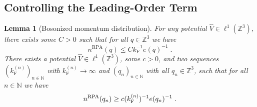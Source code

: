 \documentclass[12pt,a4paper]{article}
\numberwithin{equation}{section}
\newcommand{\NNN}{\mathbb{N}}
\newcommand{\1}{\mathbb{I}}
\newcommand{\F}{\mathrm{F}}
\newcommand{\RPA}{\mathrm{RPA}}
\newcommand{\Zstar}{\mathbb{Z}^3} %
\newcommand{\Z}{\mathbb{Z}}
\theoremstyle{plain}
\newtheorem{lemma}[theorem]{Lemma}
\theoremstyle{definition}
\theoremstyle{remark}
\theoremstyle{plain}
\theoremstyle{definition}
\theoremstyle{remark}
\begin{document}
\subsection{Controlling the Leading-Order Term}
\label{subsec:control_nqb}

\begin{lemma}[Bosonized momentum distribution] \label{lem:nqb_bounds}
For any potential $ \hat{V} \in \ell^1(\Zstar) $, there exists some $ C > 0 $
such that for all $ q \in \Z^3 $ we have
\begin{equation} \label{eq:nqb_upperbound}
	n^{\RPA}(q)
	\le C k_{\F}^{-1} e(q)^{-1} \;.
\end{equation}
There exists a potential $ \hat{V} \in \ell^1(\Zstar) $, some $ c > 0 $, and two sequences $ (k_{\F}^{(n)})_{n \in \NNN}$ with $ k_{\F}^{(n)} \to \infty $ and $ (q_n)_{n \in \NNN}$ with all $q_n \in \Z^3 $, such that for all $ n \in \NNN $ we have
\begin{equation} \label{eq:nqb_lowerbound}
	n^{\textnormal{RPA}}(q_n)
	\ge c (k_{\F}^{(n)})^{-1} e(q_n)^{-1} \;.
\end{equation}
\end{lemma}
\end{document}
